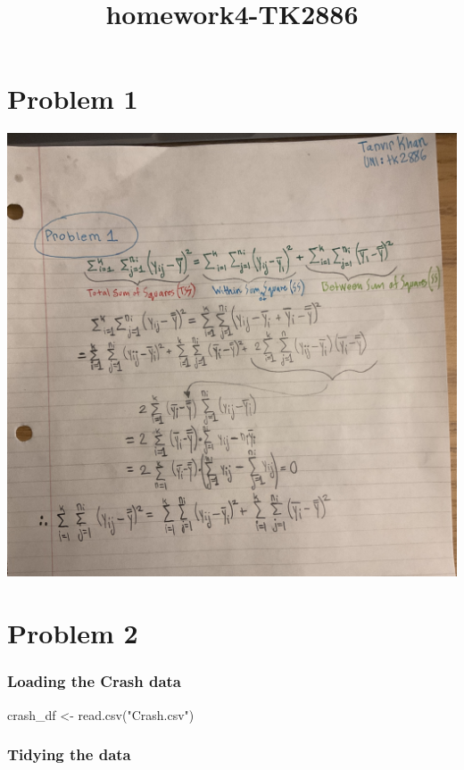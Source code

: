 \documentclass[
]{article}
\title{homework4-TK2886}
\author{}
\date{\vspace{-2.5em}}
\newenvironment{Shaded}{\begin{snugshade}}{\end{snugshade}}
\newcommand{\FunctionTok}[1]{\textcolor[rgb]{0.00,0.00,0.00}{#1}}
\newcommand{\NormalTok}[1]{#1}
\newcommand{\OtherTok}[1]{\textcolor[rgb]{0.56,0.35,0.01}{#1}}
\newcommand{\StringTok}[1]{\textcolor[rgb]{0.31,0.60,0.02}{#1}}
\begin{document}
\maketitle

\hypertarget{problem-1}{%
\section{Problem 1}\label{problem-1}}

\begin{center}\includegraphics[width=0.5\linewidth]{problem1} \end{center}

\newpage

\hypertarget{problem-2}{%
\section{Problem 2}\label{problem-2}}

\hypertarget{loading-the-crash-data}{%
\subsubsection{Loading the Crash data}\label{loading-the-crash-data}}

\begin{Shaded}
\begin{Highlighting}[]
\NormalTok{crash\_df }\OtherTok{\textless{}{-}} 
  \FunctionTok{read.csv}\NormalTok{(}\StringTok{"Crash.csv"}\NormalTok{)}
\end{Highlighting}
\end{Shaded}

\hypertarget{tidying-the-data}{%
\subsubsection{Tidying the data}\label{tidying-the-data}}
\end{document}
